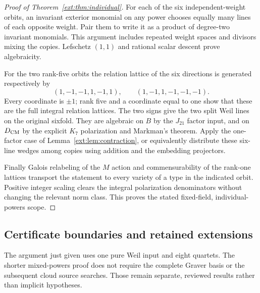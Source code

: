 \begin{proof}[Proof of Theorem~\ref{ext:thm:individual}]
For each of the six independent-weight orbits, an invariant exterior
monomial on any power chooses equally many lines of each opposite weight.
Pair them to write it as a product of degree-two invariant monomials.
This argument includes repeated weight spaces and divisors mixing the
copies. Lefschetz $(1,1)$ and rational scalar descent prove algebraicity.

For the two rank-five orbits the relation lattice of the six directions
is generated respectively by
\[
 (1,-1,-1,1,-1,1),\qquad(1,-1,1,-1,-1,-1).
\]
Every coordinate is $\pm1$; rank five and a coordinate equal to one
show that these are the full integral relation lattices. The two signs
give the two split Weil lines on the original sixfold. They are algebraic
on $B$ by the $J_{21}$ factor input, and on ${D_{\mathrm{CM}}}$ by the explicit
$K_7$ polarization and Markman's theorem. Apply the one-factor case of
Lemma~\ref{ext:lem:contraction}, or equivalently distribute these six-line
wedges among copies using addition and the embedding projectors.

Finally Galois relabeling of the $M$ action and commensurability of the
rank-one lattices transport the statement to every variety of a type
in the indicated orbit. Positive integer scaling clears the integral
polarization denominators without changing the relevant norm class.
This proves the stated fixed-field, individual-powers scope.
\end{proof}

\subsection{Certificate boundaries and retained extensions}\label{ext:sec:evidence}
The argument just given uses one pure Weil input and eight quartets.
The shorter mixed-powers proof does not require the complete Graver
basis or the subsequent cloud source searches. Those remain separate,
reviewed results rather than implicit hypotheses.

